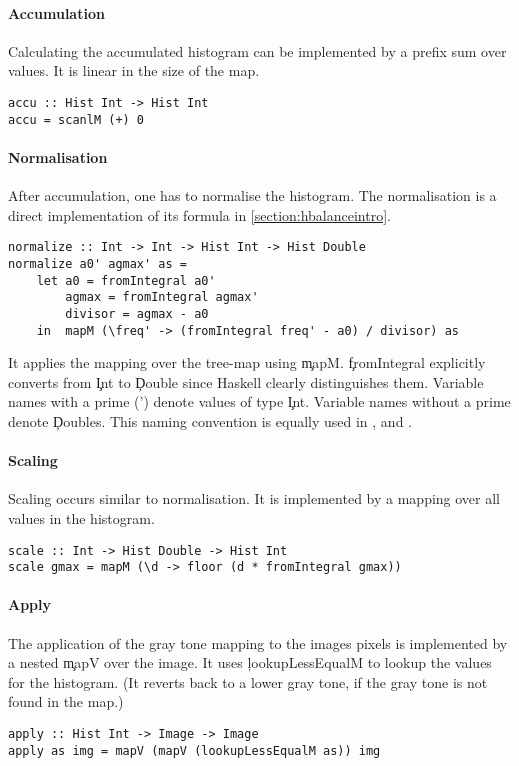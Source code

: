   \paragraph{Accumulation}
  Calculating the accumulated histogram can be implemented by
  a prefix sum over values. It is linear in the size of the map.
  \begin{lstlisting}
accu :: Hist Int -> Hist Int
accu = scanlM (+) 0
  \end{lstlisting}
    
  \paragraph{Normalisation}
  After accumulation, one has to normalise the histogram.
  The normalisation is a direct implementation of its formula in
  \ref{section:hbalanceintro}.
  \begin{lstlisting}
normalize :: Int -> Int -> Hist Int -> Hist Double
normalize a0' agmax' as =
    let a0 = fromIntegral a0'
        agmax = fromIntegral agmax'
        divisor = agmax - a0
    in  mapM (\freq' -> (fromIntegral freq' - a0) / divisor) as
  \end{lstlisting}
  It applies the mapping over the tree-map using \c{mapM}.
  \c{fromIntegral} explicitly converts from \c{Int} to \c{Double} since
  Haskell clearly distinguishes them. Variable names with a prime
  (') denote values of type \c{Int}. Variable names without a prime
  denote \c{Double}s. This naming convention is equally used in
  \man, \ndpn and \ndpv.
    
  \paragraph{Scaling}
  Scaling occurs similar to normalisation. It is implemented
  by a mapping over all values in the histogram.
  \begin{lstlisting}
scale :: Int -> Hist Double -> Hist Int
scale gmax = mapM (\d -> floor (d * fromIntegral gmax))
  \end{lstlisting}
    
  \paragraph{Apply}
  The application of the gray tone mapping to the images pixels
  is implemented by a nested \c{mapV} over the image. It uses
  \c{lookupLessEqualM} to lookup the values for the histogram.
  (It reverts back to a lower gray tone, if the gray tone is not found in the map.)
  \begin{lstlisting}
apply :: Hist Int -> Image -> Image
apply as img = mapV (mapV (lookupLessEqualM as)) img
  \end{lstlisting}
  
